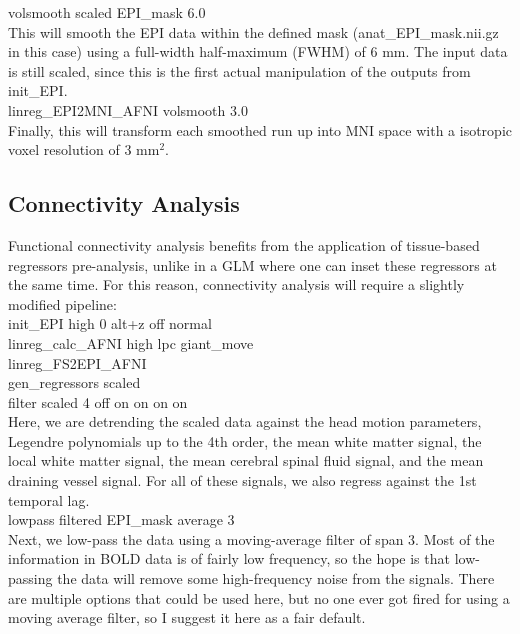 \documentclass[final,titlepage,letterpaper,oneside,12pt]{article}
\renewcommand{\texttt}[2][BrickRed]{\textcolor{#1}{\ttfamily #2}}%
\begin{document}
\noindent
\texttt{volsmooth scaled EPI\_mask 6.0} \\

This will smooth the EPI data within the defined mask (\texttt{anat\_EPI\_mask.nii.gz} in this case) using a full-width half-maximum (FWHM) of 6 mm. The input data is still scaled, since this is the first actual manipulation of the outputs from \texttt{init\_EPI}. \\

\noindent
\texttt{linreg\_EPI2MNI\_AFNI volsmooth 3.0} \\

Finally, this will transform each smoothed run up into MNI space with a isotropic voxel resolution of 3 mm$^2$. \\


\subsection{Connectivity Analysis}

Functional connectivity analysis benefits from the application of tissue-based regressors pre-analysis, unlike in a GLM where one can inset these regressors at the same time. For this reason, connectivity analysis will require a slightly modified pipeline: \\

\noindent
\texttt{init\_EPI high 0 alt+z off normal} \\
\texttt{linreg\_calc\_AFNI high lpc giant\_move} \\
\texttt{linreg\_FS2EPI\_AFNI} \\
\texttt{gen\_regressors scaled} \\

\noindent
\texttt{filter scaled 4 off on on on on} \\

Here, we are detrending the scaled data against the head motion parameters, Legendre polynomials up to the 4th order, the mean white matter signal, the local white matter signal, the mean cerebral spinal fluid signal, and the mean draining vessel signal. For all of these signals, we also regress against the 1st temporal lag. \\

\noindent
\texttt{lowpass filtered EPI\_mask average 3} \\

Next, we low-pass the data using a moving-average filter of span 3. Most of the information in BOLD data is of fairly low frequency, so the hope is that low-passing the data will remove some high-frequency noise from the signals. There are multiple options that could be used here, but no one ever got fired for using a moving average filter, so I suggest it here as a fair default.\\
\end{document}
